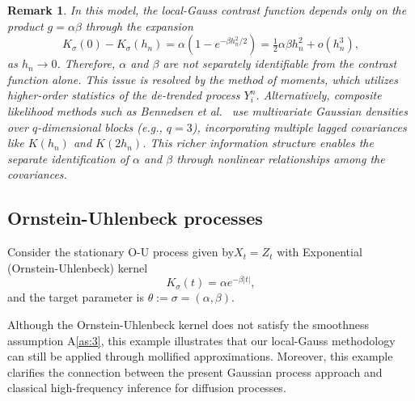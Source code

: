 \documentclass[a4paper,10pt,twoside]{article}
\newtheorem{remark}{Remark}[section]
\numberwithin{equation}{section}
\def\l{\left}
\def\r{\right}
\def\s{\sigma}
\begin{document}
\begin{remark}
In this model, the local-Gauss contrast function depends only on the product $g = \alpha\beta$ through the expansion
\[
K_\sigma(0) - K_\sigma(h_n) = \alpha \l(1 - e^{-\beta h_n^2/2}\r) = \tfrac{1}{2} \alpha\beta h_n^2 + o(h_n^3),
\]
as $h_n \to 0$. Therefore, $\alpha$ and $\beta$ are not separately identifiable from the contrast function alone. This issue is resolved by the method of moments, which utilizes higher-order statistics of the de-trended process $Y_i^n$. 
Alternatively, composite likelihood methods such as Bennedsen et al.~\cite{betal24} use multivariate Gaussian densities over $q$-dimensional blocks (e.g., $q=3$), incorporating multiple lagged covariances like $K(h_n)$ and $K(2h_n)$. This richer information structure enables the separate identification of $\alpha$ and $\beta$ through nonlinear relationships among the covariances.
\end{remark}

\subsection{Ornstein-Uhlenbeck processes}\label{ex:O-U}

Consider the stationary O-U process given by$X_t = Z_t$ with Exponential (Ornstein-Uhlenbeck) kernel 
\[
K_\sigma(t) = \alpha e^{-\beta |t|}, 
\]
and the target parameter is $\theta:= \s = (\alpha, \beta)$. 

Although the Ornstein-Uhlenbeck kernel does not satisfy the smoothness assumption A\ref{as:3},
this example illustrates that our local-Gauss methodology can still be applied through mollified approximations.
Moreover, this example clarifies the connection between the present Gaussian process approach and classical high-frequency inference for diffusion processes.
\end{document}
